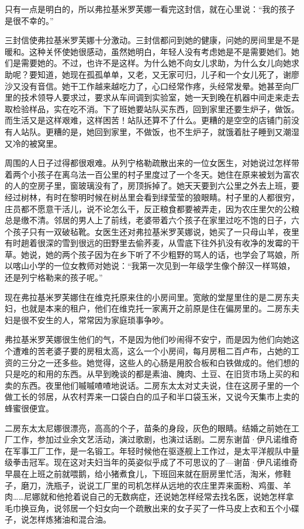 只有一点是明白的，所以弗拉基米罗芙娜一看完这封信，就在心里说：“我的孩子是很不幸的。”

三封信使弗拉基米罗芙娜十分激动。三封信都问到她的健康，问她的房间里是不是暖和。这种关怀使她很感动，虽然她明白，年轻人没有考虑她是不是需要她们。她们是需要她的。不过，也许不是这样。为什么她不向女儿求助，为什么女儿向她求助呢？要知道，她现在孤孤单单，又老，又无家可归，儿子和一个女儿死了，谢廖沙又没有音信。她干工作越来越吃力了，心口经常作疼，头经常发晕。她甚至向厂里的技术领导人要求过，要求从车间调到实验室，她一天到晚在机器中间走来走去取检验样品，实在吃不消。下了班她要站队买东西，回到家里还要生炉子，做饭。而生活又是这样艰难，这样困苦！站队还算不了什么。更糟的是空空的店铺门前没有人站队。更糟的是，她回到家里，不做饭，也不生炉子，就饿着肚子睡到又潮湿又冷的被窝里。

周围的人日子过得都很艰难。从列宁格勒疏散出来的一位女医生，对她说过怎样带着两个小孩子在离乌法一百公里的村子里度过了一个冬天。她住在原来被划为富农的人的空房子里，窗玻璃没有了，房顶拆掉了。她天天要到六公里之外去上班，要经过树林，有时在黎明时候在树丛里会看到绿莹莹的狼眼睛。村子里的人都很穷，庄员都不愿意干活儿，说不论怎么干，反正粮食都要被弄走，因为农庄里欠的公粮总是缴不清。邻居的男人上了前线，老婆带着六个孩子在家里过吃不饱的日子，六个孩子只有一双破毡靴。女医生还对弗拉基米罗芙娜说，她买了一只母山羊，夜里有时趟着很深的雪到很远的田野里去偷荞麦，从雪底下往外扒没有收净的发霉的干草。她说，她的两个孩子因为在乡下听了不少粗野的骂人的话，也学会了骂娘，所以喀山小学的一位女教师对她说：“我第一次见到一年级学生像个醉汉一样骂娘，还是列宁格勒来的孩子呢。”

现在弗拉基米罗芙娜住在维克托原来住的小房间里。宽敞的堂屋里住的是二房东夫妇，也就是本来的租户，他们在维克托一家离开之前原是住在偏房里的。二房东夫妇是很不安生的人，常常因为家庭琐事争吵。

弗拉基米罗芙娜很生他们的气，不是因为他们吵闹得不安宁，而是因为他们向她这个遭难的苦老婆子要的房租太高，这么一个小房间，每月房租二百卢布，占她的工资的三分之一还多些。她觉得，这些人的心肠是用胶合板和白铁做成的。他们想的只是吃的和用的东西。从早到晚谈的都是素油、腌肉、土豆、在旧货市场上买的和卖的东西。夜里他们嘁嘁喳喳地说话。二房东太太对丈夫说，住在这房子里的一个做工长的邻居，从农村弄来一口袋白白的瓜子和半口袋玉米，又说今天集市上卖的蜂蜜很便宜。

二房东太太尼娜很漂亮，高高的个子，苗条的身段，灰色的眼睛。结婚之前她在工厂工作，参加过业余文艺活动，演过歌剧，也演过话剧。二房东谢苗·伊凡诺维奇在军事工厂工作，是一名锻工。年轻时候他在驱逐舰上工作过，是太平洋舰队中量级拳击冠军。现在这对夫妇当年的英姿似乎成了不可思议的了—谢苗·伊凡诺维奇早晨在上班之前就喂鹅，给小猪煮食儿，下班回来就在厨房里忙活，淘米，修鞋子，磨刀，洗瓶子，说说工厂里的司机怎样从远地的农庄里弄来面粉、鸡蛋、羊肉……尼娜就和他抢着说自己的无数病症，还说她怎样经常去找名医，说她怎样拿毛巾换豆角，说邻居一个妇女向一个疏散出来的女子买了一件马皮上衣和五个小碟子，说怎样炼猪油和混合油。


